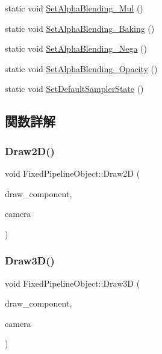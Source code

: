 \begin{DoxyCompactItemize}
\item 
static void \mbox{\hyperlink{class_fixed_pipeline_object_a98fb1d8f292840ee53981cc48ab2b8bc}{Set\+Alpha\+Blending\+\_\+\+Mul}} ()
\item 
static void \mbox{\hyperlink{class_fixed_pipeline_object_a2695c6ede59a1f73cda1b4b87a8016b5}{Set\+Alpha\+Blending\+\_\+\+Baking}} ()
\item 
static void \mbox{\hyperlink{class_fixed_pipeline_object_a6262ef0be52625876e3615133f30d4ae}{Set\+Alpha\+Blending\+\_\+\+Nega}} ()
\item 
static void \mbox{\hyperlink{class_fixed_pipeline_object_af856a4eab48cd99b7d03910cbb5cefd5}{Set\+Alpha\+Blending\+\_\+\+Opacity}} ()
\item 
static void \mbox{\hyperlink{class_fixed_pipeline_object_ab14d2a69b9e86145152848abe98f0cd2}{Set\+Default\+Sampler\+State}} ()
\end{DoxyCompactItemize}


\subsection{関数詳解}
\mbox{\label{class_fixed_pipeline_object_a83fee22327435772b48924ee842723de}} 
\subsubsection{\texorpdfstring{Draw2\+D()}{Draw2D()}}
{\footnotesize\ttfamily void Fixed\+Pipeline\+Object\+::\+Draw2D (\begin{DoxyParamCaption}\item[{\mbox{\hyperlink{class_draw_component}{Draw\+Component}} $\ast$}]{draw\+\_\+component,  }\item[{\mbox{\hyperlink{class_camera}{Camera}} $\ast$}]{camera }\end{DoxyParamCaption})\hspace{0.3cm}{\ttfamily [static]}}

\mbox{\label{class_fixed_pipeline_object_acbb1971cdba1cda9747bc3051218cf93}} 
\subsubsection{\texorpdfstring{Draw3\+D()}{Draw3D()}}
{\footnotesize\ttfamily void Fixed\+Pipeline\+Object\+::\+Draw3D (\begin{DoxyParamCaption}\item[{\mbox{\hyperlink{class_draw_component}{Draw\+Component}} $\ast$}]{draw\+\_\+component,  }\item[{\mbox{\hyperlink{class_camera}{Camera}} $\ast$}]{camera }\end{DoxyParamCaption})\hspace{0.3cm}{\ttfamily [static]}}

